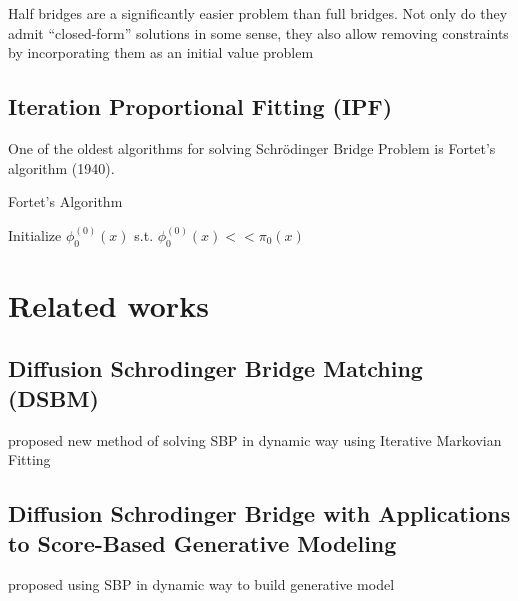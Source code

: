 \documentclass{article}
\begin{document}
Half bridges are a significantly easier problem than full bridges. Not only do they admit “closed-form” solutions in some sense, they also allow removing constraints by incorporating them as an initial value problem
\subsection{Iteration Proportional Fitting (IPF)}
One of the oldest algorithms for solving Schrödinger Bridge Problem is Fortet's algorithm (1940).

\begin{algorithm}
\caption{Fortet's Algorithm}\label{alg:fortret}
Initialize $\phi_0^{(0)}(x)$ s.t. $\phi_0^{(0)}(x)<<\pi_0(x)$\;
\end{algorithm}

\section{Related works}
\subsection{Diffusion Schrodinger Bridge Matching (DSBM)}
\citet{dsbm}  proposed new method of solving SBP in dynamic way using Iterative Markovian Fitting
\subsection{Diffusion Schrodinger Bridge with Applications to Score-Based Generative Modeling}
\citet{dsb} proposed using SBP in dynamic way to build generative model


% 


\end{document}
